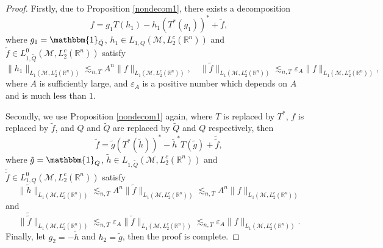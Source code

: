 \documentclass[oneside,english,a4wide]{amsart}
\numberwithin{equation}{section}
\numberwithin{figure}{section}
\theoremstyle{plain}
\theoremstyle{plain}
\theoremstyle{definition}
\theoremstyle{plain}
\theoremstyle{remark}
\theoremstyle{definition}
\theoremstyle{remark}
\theoremstyle{definition}
\newcommand{\8}{\infty}
\begin{document}
\begin{proof}
	Firstly, due to Proposition \ref{nondecom1}, there exists a decomposition
		\begin{equation*}
		f=g_1T(h_1)-h_1(T^*(g_1))^*+\tilde{f},
	\end{equation*}
	where $g_1=\mathbbm{1}_{\tilde{Q}}$, $h_1\in L_{1,Q}(\mathcal{M},L_2^c(\mathbb{R}^n))$ and $\tilde{f}\in L^0_{1,\tilde{Q}}(\mathcal{M},L_2^c(\mathbb{R}^n))$ satisfy
	\begin{equation*}
		\|h_1\|_{L_{1}(\mathcal{M},L_2^c(\mathbb{R}^n))}\lesssim_{n,T} A^n\|f\|_{L_{1}(\mathcal{M},L_2^c(\mathbb{R}^n))},\quad \|\tilde{f}\|_{L_{1}(\mathcal{M},L_2^c(\mathbb{R}^n))}\lesssim_{n,T} \varepsilon_A\|f\|_{L_{1}(\mathcal{M},L_2^c(\mathbb{R}^n))},
	\end{equation*}
	where $A$ is sufficiently large, and $\varepsilon_A$ is a positive number which depends on $A$ and is much less than $1$.
	
    Secondly, we use Proposition \ref{nondecom1} again, where $T$ is replaced by $T^*$, $f$ is replaced by $\tilde{f}$, and $Q$ and $\tilde{Q}$ are replaced by $\tilde{Q}$ and $Q$ respectively, then
    \begin{equation*}
    	\tilde{f}=\tilde{g}(T^*(\tilde{h}))^*-\tilde{h}^*{T(\tilde{g})}+\tilde{\tilde{f}},
    \end{equation*}
    where $\tilde{g}=\mathbbm{1}_{{Q}}$, $\tilde{h}\in L_{1,\tilde{Q}}(\mathcal{M},L_2^c(\mathbb{R}^n))$ and $\tilde{\tilde{f}}\in L^0_{1,{Q}}(\mathcal{M},L_2^c(\mathbb{R}^n))$ satisfy
    \begin{equation*}
    	\|\tilde{h}\|_{L_{1}(\mathcal{M},L_2^c(\mathbb{R}^n))}\lesssim_{n,T} A^n\|\tilde{f}\|_{L_{1}(\mathcal{M},L_2^c(\mathbb{R}^n))}\lesssim_{n,T} A^n\|f\|_{L_{1}(\mathcal{M},L_2^c(\mathbb{R}^n))}
    \end{equation*}
    and
    \begin{equation*}
	     \|\tilde{\tilde{f}}\|_{L_{1}(\mathcal{M},L_2^c(\mathbb{R}^n))}\lesssim_{n,T} \varepsilon_A\|\tilde{f}\|_{L_{1}(\mathcal{M},L_2^c(\mathbb{R}^n))}\lesssim_{n,T} \varepsilon_A\|f\|_{L_{1}(\mathcal{M},L_2^c(\mathbb{R}^n))}.
    \end{equation*}
    Finally, let $g_2=-\tilde{h}$ and $h_2=\tilde{g}$, then the proof is complete.
\end{proof}
\end{document}
